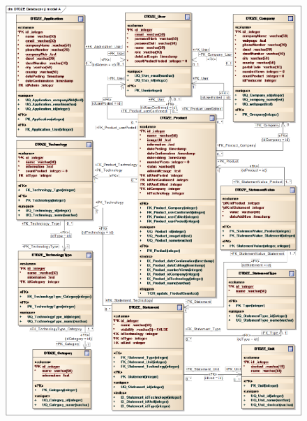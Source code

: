 \documentclass[11pt,a4paper]{article}
\begin{document}
\begin{figure}[H] 
\centering  
\includegraphics[scale=0.71]{DTOZE_fyzA_final_n} 
\end{figure}
\end{document}
